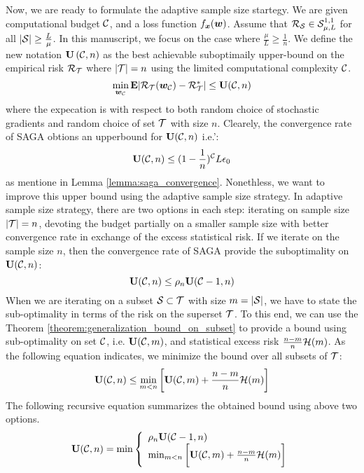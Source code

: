 Now, we are ready to formulate the adaptive sample size startegy. We are given
computational budget $\C$, and a loss function $f_{\x}(\w)$. Assume that
$\risk_{\S} \in \smoothstrong$ for all $|\S| \geq \frac{L}{\mu}$. In this
manuscript, we focus on the case where $\frac{\mu}{L} \geq \frac{1}{n}$. We
define the new notation $\U\left(\C,n\right)$ as the best achievable suboptimaily upper-bound on the empirical risk $\risk_{\T}$ where $|\T| = n$ using the
limited computational complexity $\C$.
\begin{equation*}
	  \min_{\w_{\C}} \E| \risk_{\T}(\w_{\C}) - \risk_{\T}^* |
	  \leq \U(\C,n)
\end{equation*} 
where the expecation is with respect to both random choice of stochastic
gradients and random choice of set $\T$ with size $n$. Clearely, the
convergence rate of SAGA obtions an upperbound for $\U(\C,n)$ i.e.':
\begin{equation*}
	\U(\C,n) \leq (1-\frac{1}{n})^{\C} L \epsilon_0
\end{equation*}
as mentione in Lemma \ref{lemma:saga_convergence}. 
Nonethless, we want to improve this upper bound using the adaptive sample size strategy. In
adaptive sample size strategy, there are two options in each step: iterating on
sample size $|\T|=n$, devoting the budget partially on a smaller sample size
with better convergence rate in exchange of the excess statistical risk. If we
iterate on the sample size $n$, then the convergence rate of SAGA provide the
suboptimality on $\U(\C,n)$:
\begin{equation*}
	\U(\C,n) \leq \rho_{n} \U(\C-1,n)
\end{equation*}
 When we are iterating on a
subset $\S \subset \T$ with size $m = |\S|$, we have to state the
sub-optimality in terms of the risk on the superset $\T$. To this end, we can use
the Theorem \ref{theorem:generalization_bound_on_subset} to provide a bound
using sub-optimality on set $\C$, i.e. $\U(\C,m)$, and statistical excess risk
$\frac{n - m}{n}\bound(m)$. As the following equation indicates,
we minimize the bound over all subsets of $\T$:
\begin{equation*}
	\U(\C,n) \leq \min_{m < n} \bigg[\U(\C,m) + \frac{n - m}{n}
		\bound(m) \bigg]
\end{equation*}
The following
recursive equation summarizes the obtained bound using above two options.
\begin{equation} \label{eq:recursion}
	\U(\C,n) = \min
\left\{
	\begin{array}{ll}
		 \rho_{n} \U(\C-1,n)\\
		\min_{m < n} \bigg[\U(\C,m) + \frac{n - m}{n}
		\bound(m) \bigg]
	\end{array}
\right.
\end{equation}
